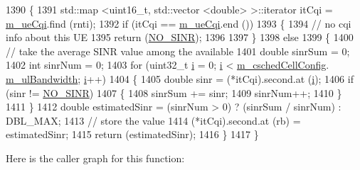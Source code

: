 \begin{DoxyCode}
1390 \{
1391   std::map <uint16\_t, std::vector <double> >::iterator itCqi = \hyperlink{classns3_1_1TtaFfMacScheduler_ac07e60af8c68f1cfac9b8666119af78f}{m\_ueCqi}.find (rnti);
1392   \textcolor{keywordflow}{if} (itCqi == \hyperlink{classns3_1_1TtaFfMacScheduler_ac07e60af8c68f1cfac9b8666119af78f}{m\_ueCqi}.end ())
1393     \{
1394       \textcolor{comment}{// no cqi info about this UE}
1395       \textcolor{keywordflow}{return} (\hyperlink{cqa-ff-mac-scheduler_8h_a520d71777be043568160c783a9c65fd5}{NO\_SINR});
1396 
1397     \}
1398   \textcolor{keywordflow}{else}
1399     \{
1400       \textcolor{comment}{// take the average SINR value among the available}
1401       \textcolor{keywordtype}{double} sinrSum = 0;
1402       \textcolor{keywordtype}{int} sinrNum = 0;
1403       \textcolor{keywordflow}{for} (uint32\_t \hyperlink{bernuolliDistribution_8m_a6f6ccfcf58b31cb6412107d9d5281426}{i} = 0; \hyperlink{bernuolliDistribution_8m_a6f6ccfcf58b31cb6412107d9d5281426}{i} < \hyperlink{classns3_1_1TtaFfMacScheduler_af263a06ea69ff1d096ddb48df0ac7f81}{m\_cschedCellConfig}.
      \hyperlink{structns3_1_1FfMacCschedSapProvider_1_1CschedCellConfigReqParameters_a5ab5b102878e6e7e7727a14af4a64d2f}{m\_ulBandwidth}; \hyperlink{bernuolliDistribution_8m_a6f6ccfcf58b31cb6412107d9d5281426}{i}++)
1404         \{
1405           \textcolor{keywordtype}{double} sinr = (*itCqi).second.at (\hyperlink{bernuolliDistribution_8m_a6f6ccfcf58b31cb6412107d9d5281426}{i});
1406           \textcolor{keywordflow}{if} (sinr != \hyperlink{cqa-ff-mac-scheduler_8h_a520d71777be043568160c783a9c65fd5}{NO\_SINR})
1407             \{
1408               sinrSum += sinr;
1409               sinrNum++;
1410             \}
1411         \}
1412       \textcolor{keywordtype}{double} estimatedSinr = (sinrNum > 0) ? (sinrSum / sinrNum) : DBL\_MAX;
1413       \textcolor{comment}{// store the value}
1414       (*itCqi).second.at (rb) = estimatedSinr;
1415       \textcolor{keywordflow}{return} (estimatedSinr);
1416     \}
1417 \}
\end{DoxyCode}


Here is the caller graph for this function\+:



